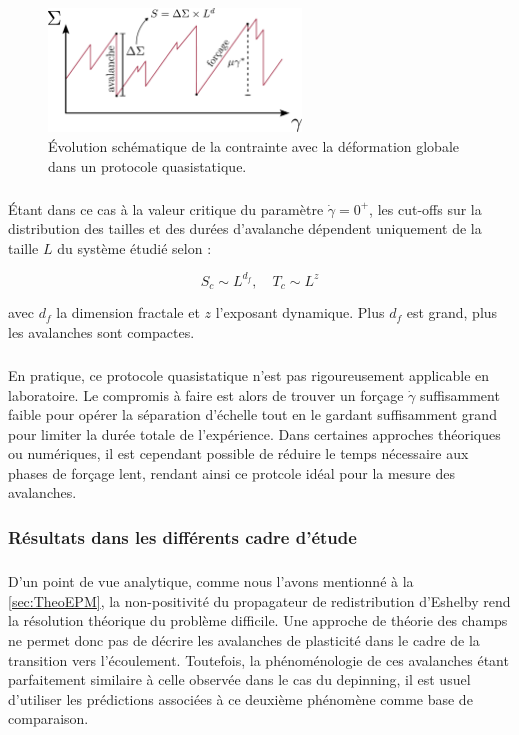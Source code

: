 \begin{figure}[h]
	\centering
	\includegraphics[width= 0.6\textwidth]{Chapitre4/Figures/Avalanches/AQS.pdf}
	\caption{Évolution schématique de la contrainte avec la déformation globale dans un protocole quasistatique.}
	\label{fig:AQS}
\end{figure}

\subparagraph{}Étant dans ce cas à la valeur critique du paramètre $\dot{\gamma} = 0^+$, les cut-offs sur la distribution des tailles et des durées d'avalanche dépendent uniquement de la taille $L$ du système étudié selon :

\begin{equation}
	S_c \sim L^{d_f}, \quad T_c \sim L^z
\end{equation}

\noindent avec $d_f$ la dimension fractale et $z$ l'exposant dynamique. Plus $d_f$ est grand, plus les avalanches sont compactes.

\subparagraph{}En pratique, ce protocole quasistatique n'est pas rigoureusement applicable en laboratoire. Le compromis à faire est alors de trouver un forçage $\dot{\gamma}$ suffisamment faible pour opérer la séparation d'échelle tout en le gardant suffisamment grand pour limiter la durée totale de l'expérience. Dans certaines approches théoriques ou numériques, il est cependant possible de réduire le temps nécessaire aux phases de forçage lent, rendant ainsi ce protcole idéal pour la mesure des avalanches.

\subsubsection{Résultats dans les différents cadre d'étude}

\subparagraph{}D'un point de vue analytique, comme nous l'avons mentionné à la \autoref{sec:TheoEPM}, la non-positivité du propagateur de redistribution d'Eshelby rend la résolution théorique du problème difficile. Une approche de théorie des champs ne permet donc pas de décrire les avalanches de plasticité dans le cadre de la transition vers l'écoulement. Toutefois, la phénoménologie de ces avalanches étant parfaitement similaire à celle observée dans le cas du depinning, il est usuel d'utiliser les prédictions associées à ce deuxième phénomène comme base de comparaison.

